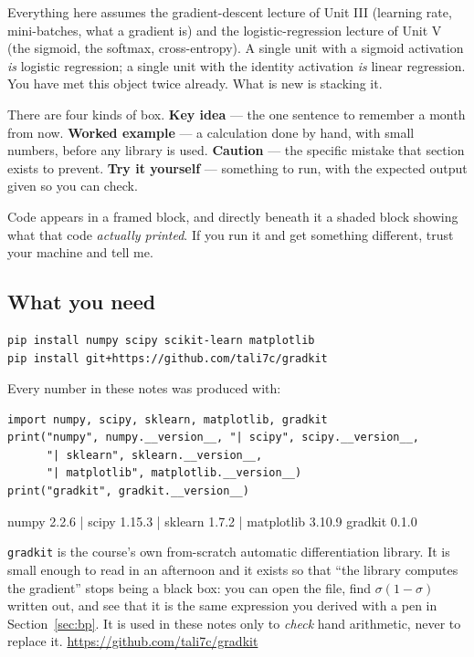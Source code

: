 \documentclass[11pt]{article}
\begin{document}
Everything here assumes the gradient-descent lecture of Unit III (learning
rate, mini-batches, what a gradient is) and the logistic-regression lecture of
Unit V (the sigmoid, the softmax, cross-entropy). A single unit with a sigmoid
activation \emph{is} logistic regression; a single unit with the identity
activation \emph{is} linear regression. You have met this object twice
already. What is new is stacking it.

There are four kinds of box. \textbf{Key idea} --- the one sentence to
remember a month from now. \textbf{Worked example} --- a calculation done by
hand, with small numbers, before any library is used. \textbf{Caution} --- the
specific mistake that section exists to prevent. \textbf{Try it yourself} ---
something to run, with the expected output given so you can check.

Code appears in a framed block, and directly beneath it a shaded block showing
what that code \emph{actually printed}. If you run it and get something
different, trust your machine and tell me.

\subsection{What you need}

\begin{lstlisting}
pip install numpy scipy scikit-learn matplotlib
pip install git+https://github.com/tali7c/gradkit
\end{lstlisting}

Every number in these notes was produced with:

\begin{lstlisting}
import numpy, scipy, sklearn, matplotlib, gradkit
print("numpy", numpy.__version__, "| scipy", scipy.__version__,
      "| sklearn", sklearn.__version__,
      "| matplotlib", matplotlib.__version__)
print("gradkit", gradkit.__version__)
\end{lstlisting}
\begin{codeout}
numpy 2.2.6 | scipy 1.15.3 | sklearn 1.7.2 | matplotlib 3.10.9
gradkit 0.1.0
\end{codeout}

\texttt{gradkit} is the course's own from-scratch automatic differentiation
library. It is small enough to read in an afternoon and it exists so that
``the library computes the gradient'' stops being a black box: you can open
the file, find $\sigma(1-\sigma)$ written out, and see that it is the same
expression you derived with a pen in Section~\ref{sec:bp}. It is used in these
notes only to \emph{check} hand arithmetic, never to replace it.
\url{https://github.com/tali7c/gradkit}
\end{document}
